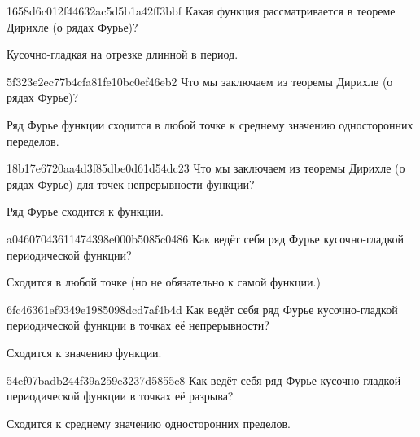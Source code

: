 \begin{note}{1658d6c012f44632ac5d5b1a42ff3bbf}
    Какая функция рассматривается в теореме Дирихле (о рядах Фурье)?

    \begin{cloze}{1}
        Кусочно-гладкая на отрезке длинной в период.
    \end{cloze}
\end{note}

\begin{note}{5f323e2ec77b4cfa81fe10bc0ef46eb2}
    Что мы заключаем из теоремы Дирихле (о рядах Фурье)?

    \begin{cloze}{1}
        Ряд Фурье функции сходится в любой точке к среднему значению односторонних переделов.
    \end{cloze}
\end{note}

\begin{note}{18b17e6720aa4d3f85dbe0d61d54dc23}
    Что мы заключаем из теоремы Дирихле (о рядах Фурье) для точек непрерывности функции?

    \begin{cloze}{1}
        Ряд Фурье сходится к функции.
    \end{cloze}
\end{note}

\begin{note}{a04607043611474398e000b5085c0486}
    Как ведёт себя ряд Фурье кусочно-гладкой периодической функции?

    \begin{cloze}{1}
        Сходится в любой точке (но не обязательно к самой функции.)
    \end{cloze}
\end{note}

\begin{note}{6fc46361ef9349e1985098dcd7af4b4d}
    Как ведёт себя ряд Фурье кусочно-гладкой периодической функции в точках её непрерывности?

    \begin{cloze}{1}
        Сходится к значению функции.
    \end{cloze}
\end{note}

\begin{note}{54ef07badb244f39a259e3237d5855c8}
    Как ведёт себя ряд Фурье кусочно-гладкой периодической функции в точках её разрыва?

    \begin{cloze}{1}
        Сходится к среднему значению односторонних пределов.
    \end{cloze}
\end{note}


